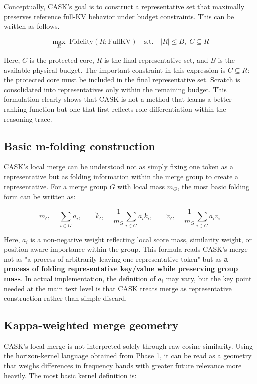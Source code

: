 Conceptually, CASK's goal is to construct a representative set that maximally preserves reference full-KV behavior under budget constraints. This can be written as follows.


$$
\max_{R} \; \mathrm{Fidelity}(R; \mathrm{FullKV})
\quad
\text{s.t.}
\quad
|R| \le B,
\; C \subseteq R
$$


Here, $C$ is the protected core, $R$ is the final representative set, and $B$ is the available physical budget. The important constraint in this expression is $C \subseteq R$: the protected core must be included in the final representative set. Scratch is consolidated into representatives only within the remaining budget. This formulation clearly shows that CASK is not a method that learns a better ranking function but one that first reflects role differentiation within the reasoning trace.


\subsection{Basic m-folding construction}


CASK's local merge can be understood not as simply fixing one token as a representative but as folding information within the merge group to create a representative. For a merge group $G$ with local mass $m_G$, the most basic folding form can be written as:


$$
m_G = \sum_{i \in G} a_i,
\qquad
\tilde{k}_G = \frac{1}{m_G} \sum_{i \in G} a_i k_i,
\qquad
\tilde{v}_G = \frac{1}{m_G} \sum_{i \in G} a_i v_i
$$


Here, $a_i$ is a non-negative weight reflecting local score mass, similarity weight, or position-aware importance within the group. This formula reads CASK's merge not as "a process of arbitrarily leaving one representative token" but as \textbf{a process of folding representative key/value while preserving group mass}. In actual implementation, the definition of $a_i$ may vary, but the key point needed at the main text level is that CASK treats merge as representative construction rather than simple discard.


\subsection{Kappa-weighted merge geometry}


CASK's local merge is not interpreted solely through raw cosine similarity. Using the horizon-kernel language obtained from Phase 1, it can be read as a geometry that weighs differences in frequency bands with greater future relevance more heavily. The most basic kernel definition is:


